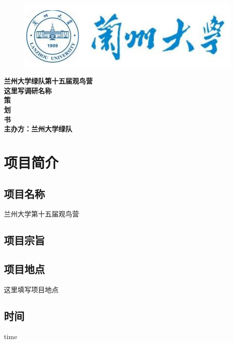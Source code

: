 \documentclass[UTF8,a4paper，12pt]{ctexart}
\begin{document}
\large
\begin{titlepage}
    \begin{figure}
        \centering
        \includegraphics[width=0.6\linewidth]{image/title.png}
    \end{figure}
\begin{center}
    \fontsize{25pt}{0}\bf{兰州大学绿队第十五届观鸟营}\\
    \vspace{0.8em}
    \fontsize{15pt}{0}\bf{这里写调研名称}\\
    \vspace{1.5em}
    \fontsize{52pt}{0}\bf{策}\\
    \vspace{1.5em}
    \fontsize{52pt}{0}\bf{划}\\
    \vspace{1.5em}
    \fontsize{60pt}{0}\bf{书}\\
    \vspace{2em}
    \fontsize{15pt}{0}\bf{主办方：兰州大学绿队}
\end{center}
\end{titlepage}
\clearpage
\pagestyle{fancy}
\tableofcontents 
\newpage
\setcounter{page}{1}
\vspace{1.5em}
\newpage
\section{项目简介}
\subsection{项目名称}
\hspace{3pt} 兰州大学第十五届观鸟营
\subsection{项目宗旨}
\hspace{3pt} 
\subsection{项目地点}
\hspace{3pt} 这里填写项目地点
\subsection{时间}
\hspace{3pt} time
\end{document}
